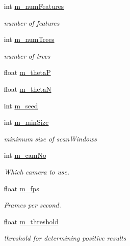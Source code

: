 \begin{DoxyCompactItemize}
int \hyperlink{classtld_1_1_settings_af15afe9f4ffb32e89686c8e90026e2bc}{m\_\-numFeatures}
\begin{DoxyCompactList}\small\item\em number of features \item\end{DoxyCompactList}\item 
int \hyperlink{classtld_1_1_settings_a959d793b002e13f6758fc84765b7d33d}{m\_\-numTrees}
\begin{DoxyCompactList}\small\item\em number of trees \item\end{DoxyCompactList}\item 
float \hyperlink{classtld_1_1_settings_adade7d3269f34113e92abdb3816058f7}{m\_\-thetaP}
\item 
float \hyperlink{classtld_1_1_settings_aef49627d1ffac7dda7cc83c7ba6a25bd}{m\_\-thetaN}
\item 
int \hyperlink{classtld_1_1_settings_a07dc62407c3373e7fa3906c145593b69}{m\_\-seed}
\item 
int \hyperlink{classtld_1_1_settings_aa08ffe8f36cb983224fadfd3d3b28391}{m\_\-minSize}
\begin{DoxyCompactList}\small\item\em minimum size of scanWindows \item\end{DoxyCompactList}\item 
int \hyperlink{classtld_1_1_settings_a01db1115a98b15abdab2c03cdacadfdd}{m\_\-camNo}
\begin{DoxyCompactList}\small\item\em Which camera to use. \item\end{DoxyCompactList}\item 
float \hyperlink{classtld_1_1_settings_aaa119898fb2f14ce2eed7fc861733eac}{m\_\-fps}
\begin{DoxyCompactList}\small\item\em Frames per second. \item\end{DoxyCompactList}\item 
float \hyperlink{classtld_1_1_settings_afc2357da344888ad2158cbb51f8eb377}{m\_\-threshold}
\begin{DoxyCompactList}\small\item\em threshold for determining positive results \item\end{DoxyCompactList}\item 

\end{DoxyCompactItemize}
